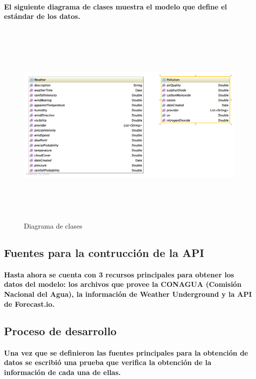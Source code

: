   \paragraph{El siguiente diagrama de clases muestra el modelo que define el estándar de los datos.}
    \begin{figure}[b!]
    \begin{center}
      \includegraphics[width=14cm,height=10cm]{./images/SmartOwl_ClassDiagram}
      \caption{Diagrama de clases}
    \end{center}
    \end{figure}
  \newpage
  \subsection{Fuentes para la contrucción de la API}
    \paragraph{Hasta ahora se cuenta con 3 recursos principales para obtener los datos del modelo: los archivos que provee la CONAGUA (Comisión Nacional del Agua), la información de Weather Underground y la API de Forecast.io.}
     
  \subsection{Proceso de desarrollo} 
    \paragraph{Una vez que se definieron las fuentes principales para la obtención de datos se escribió una prueba que verifica la obtención de la información de cada una de ellas.} 
